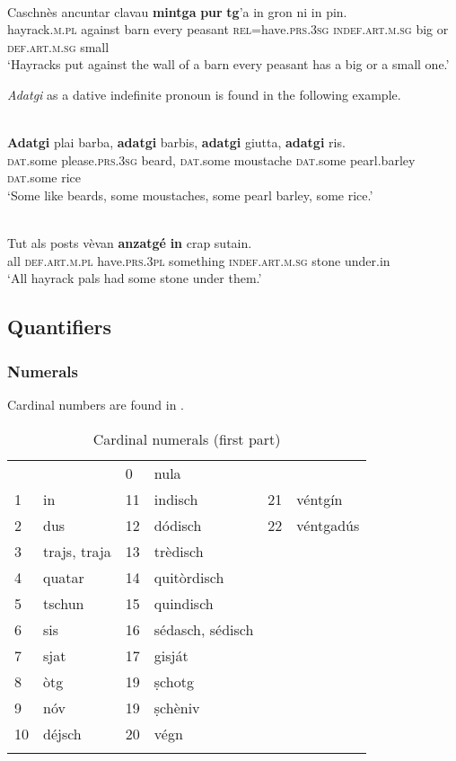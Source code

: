 {\ea\label{}
\\
\gll Caschnès ancuntar clavau \textbf{mintga} \textbf{pur} \textbf{tg}'a in gron ni in pin.\\
     hayrack.\textsc{m.pl} against barn every peasant \textsc{rel}=have.\textsc{prs.3sg} \textsc{indef.art.m.sg} big or \textsc{def.art.m.sg} small\\
\glt `Hayracks put against the wall of a barn every peasant has a big or a small one.'
\z


\textit{Adatgi} as a dative indefinite pronoun is found in the following example. %

\ea\label{}
\\
\gll  \textbf{Adatgi} plai barba, \textbf{adatgi} barbis, \textbf{adatgi} giutta, \textbf{adatgi} ris. \\
    \textsc{dat}.some please.\textsc{prs.3sg} beard,  \textsc{dat}.some moustache \textsc{dat}.some pearl.barley \textsc{dat}.some rice \\
\glt `Some like beards, some moustaches, some pearl barley, some rice.'
\z


\ea\label{}
\\
\gll   Tut als posts vèvan \textbf{anzatgé} \textbf{in} crap sutain.\\
     all \textsc{def.art.m.pl} have.\textsc{prs.3pl} something \textsc{indef.art.m.sg} stone under.in\\
\glt `All hayrack pals had some stone under them.'
\z





\subsection{Quantifiers}

\subsubsection{Numerals}
Cardinal numbers are found in .


\begin{table}
\caption{Cardinal numerals (first part)} 
\label{tab:cardnum1}
 \begin{tabular}{llllll}
  \lsptoprule
  \midrule
&&0&nula\\
1&in&11&indisch&21&véntgín\\
2&dus&12&dódisch&22&véntgadús\\
3&trajs, traja&13&trèdisch&\\
4&quatar&14&quitòrdisch&\\
5&tschun&15&quindisch\\
6&sis&16&sédasch, sédisch\\
7&sjat&17&gisját\\
8&òtg&19& ṣchotg\\ %
9&nóv&19& ṣchèniv\\
10&déjsch&20&végn\\
  \lspbottomrule
 \end{tabular}
\end{table}

}
